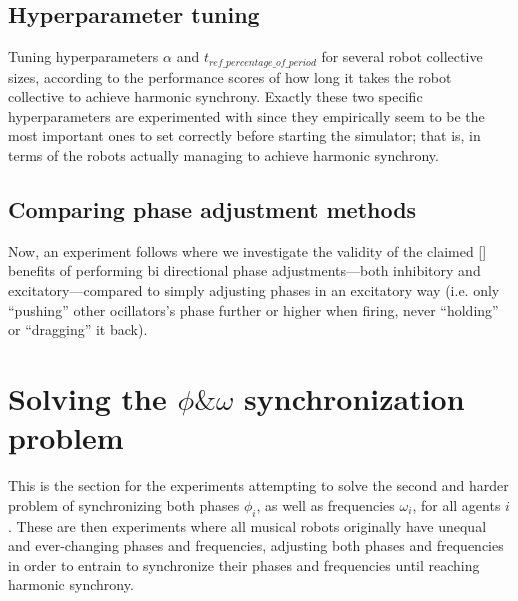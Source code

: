 		
		\subsection{Hyperparameter tuning}
		Tuning hyperparameters $\alpha$ and $t_{ref\_percentage\_of\_period}$ for several robot collective sizes, according to the performance scores of how long it takes the robot collective to achieve harmonic synchrony. Exactly these two specific hyperparameters are experimented with since they empirically seem to be the most important ones to set correctly before starting the simulator; that is, in terms of the robots actually managing to achieve harmonic synchrony.
		
		
		\subsection{Comparing phase adjustment methods}
		Now, an experiment follows where we investigate the validity of the claimed [] benefits of performing bi directional phase adjustments—both inhibitory and excitatory—compared to simply adjusting phases in an excitatory way (i.e. only ``pushing'' other ocillators's phase further or higher when firing, never ``holding'' or ``dragging'' it back).
		
		
		
		
	\section{Solving the $\phi \& \omega$ synchronization problem}
	This is the section for the experiments attempting to solve the second and harder problem of synchronizing both phases $\phi_i$, as well as frequencies $\omega_i$, for all agents $i$. These are then experiments where all musical robots originally have unequal and ever-changing phases  and frequencies, adjusting both phases and frequencies in order to entrain to synchronize their phases and frequencies until reaching harmonic synchrony.

